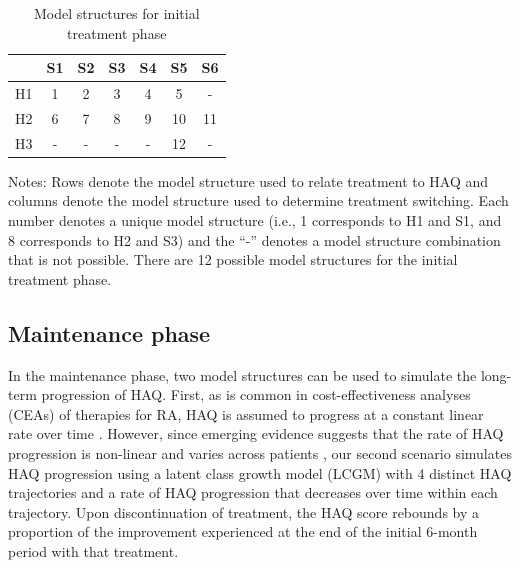 \documentclass[11pt,final,fleqn]{article}\usepackage[]{graphicx}\usepackage[]{color}
\theoremstyle{plain}
\begin{document}
\begin{table}[!ht] 
\begin{center}
\begin{threeparttable}
\caption{Model structures for initial treatment phase} \label{tbl:initial-model-structure}
\begin{tabularx}{\textwidth}{@{\extracolsep{\fill}}lcccccc}
\hline
\multicolumn{1}{l}{} & \multicolumn{1}{c}{S1} & \multicolumn{1}{c}{S2} & \multicolumn{1}{c}{S3} & \multicolumn{1}{c}{S4} & \multicolumn{1}{c}{S5} & \multicolumn{1}{c}{S6}  \\
\hline
H1 & 1 & 2 & 3 & 4 & 5 & - \\
H2 & 6 & 7 & 8 & 9 & 10 & 11 \\
H3 & - & - & - & - & 12  & -\\
\hline
\end{tabularx}
\scriptsize
Notes: Rows denote the model structure used to relate treatment to HAQ and columns denote the model structure used to determine treatment switching. Each number denotes a unique model structure (i.e., 1 corresponds to H1 and S1, and 8 corresponds to H2 and S3) and the ``-'' denotes a model structure combination that is not possible. There are 12 possible model structures for the initial treatment phase. 
\end{threeparttable}
\end{center}
\end{table}

\subsection{Maintenance phase}
In the maintenance phase, two model structures can be used to simulate the long-term progression of HAQ. First, as is common in cost-effectiveness analyses (CEAs) of therapies for RA, HAQ is assumed to progress at a constant linear rate over time \citep[see][]{tosh2011sheffield, wailoo2008biologic}. However, since emerging evidence suggests that the rate of HAQ progression is non-linear and varies across patients \citep{gibson2016haq}, our second scenario simulates HAQ progression using a latent class growth model (LCGM) \citep{norton2014health} with 4 distinct HAQ trajectories and a rate of HAQ progression that decreases over time within each trajectory. Upon discontinuation of treatment, the HAQ score rebounds by a proportion of the improvement experienced at the end of the initial 6-month period with that treatment.
\end{document}
